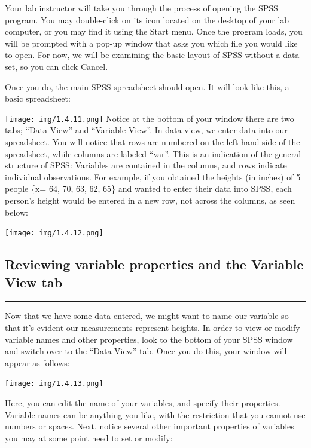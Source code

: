 \documentclass[]{book}
\begin{document}
Your lab instructor will take you through the process of opening the
SPSS program. You may double-click on its icon located on the desktop of
your lab computer, or you may find it using the Start menu. Once the
program loads, you will be prompted with a pop-up window that asks you
which file you would like to open. For now, we will be examining the
basic layout of SPSS without a data set, so you can click {Cancel}.

Once you do, the main SPSS spreadsheet should open. It will look like
this, a basic spreadsheet:

\texttt{[image: img/1.4.11.png]} Notice at the bottom of your window
there are two tabs; ``Data View'' and ``Variable View''. In data view,
we enter data into our spreadsheet. You will notice that rows are
numbered on the left-hand side of the spreadsheet, while columns are
labeled ``var''. This is an indication of the general structure of SPSS:
Variables are contained in the columns, and rows indicate individual
observations. For example, if you obtained the heights (in inches) of 5
people \{x= 64, 70, 63, 62, 65\} and wanted to enter their data into
SPSS, each person's height would be entered in a new row, not across the
columns, as seen below:

\texttt{[image: img/1.4.12.png]}

\subsection{Reviewing variable properties and the Variable View
tab}\label{reviewing-variable-properties-and-the-variable-view-tab}

\begin{center}\rule{0.5\linewidth}{0.5pt}\end{center}

Now that we have some data entered, we might want to name our variable
so that it's evident our measurements represent heights. In order to
view or modify variable names and other properties, look to the bottom
of your SPSS window and switch over to the ``Data View'' tab. Once you
do this, your window will appear as follows:

\texttt{[image: img/1.4.13.png]}

Here, you can edit the name of your variables, and specify their
properties. Variable names can be anything you like, with the
restriction that you cannot use numbers or spaces. Next, notice several
other important properties of variables you may at some point need to
set or modify:
\end{document}
